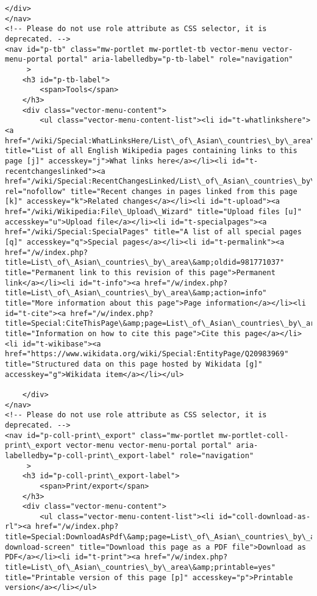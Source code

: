 \documentclass[11pt]{article}
\begin{document}
\begin{Verbatim}[commandchars=\\\{\}]
	</div>
</nav>
<!-- Please do not use role attribute as CSS selector, it is deprecated. -->
<nav id="p-tb" class="mw-portlet mw-portlet-tb vector-menu vector-menu-portal portal" aria-labelledby="p-tb-label" role="navigation" 
	 >
	<h3 id="p-tb-label">
		<span>Tools</span>
	</h3>
	<div class="vector-menu-content">
		<ul class="vector-menu-content-list"><li id="t-whatlinkshere"><a href="/wiki/Special:WhatLinksHere/List\_of\_Asian\_countries\_by\_area" title="List of all English Wikipedia pages containing links to this page [j]" accesskey="j">What links here</a></li><li id="t-recentchangeslinked"><a href="/wiki/Special:RecentChangesLinked/List\_of\_Asian\_countries\_by\_area" rel="nofollow" title="Recent changes in pages linked from this page [k]" accesskey="k">Related changes</a></li><li id="t-upload"><a href="/wiki/Wikipedia:File\_Upload\_Wizard" title="Upload files [u]" accesskey="u">Upload file</a></li><li id="t-specialpages"><a href="/wiki/Special:SpecialPages" title="A list of all special pages [q]" accesskey="q">Special pages</a></li><li id="t-permalink"><a href="/w/index.php?title=List\_of\_Asian\_countries\_by\_area\&amp;oldid=981771037" title="Permanent link to this revision of this page">Permanent link</a></li><li id="t-info"><a href="/w/index.php?title=List\_of\_Asian\_countries\_by\_area\&amp;action=info" title="More information about this page">Page information</a></li><li id="t-cite"><a href="/w/index.php?title=Special:CiteThisPage\&amp;page=List\_of\_Asian\_countries\_by\_area\&amp;id=981771037\&amp;wpFormIdentifier=titleform" title="Information on how to cite this page">Cite this page</a></li><li id="t-wikibase"><a href="https://www.wikidata.org/wiki/Special:EntityPage/Q20983969" title="Structured data on this page hosted by Wikidata [g]" accesskey="g">Wikidata item</a></li></ul>
		
	</div>
</nav>
<!-- Please do not use role attribute as CSS selector, it is deprecated. -->
<nav id="p-coll-print\_export" class="mw-portlet mw-portlet-coll-print\_export vector-menu vector-menu-portal portal" aria-labelledby="p-coll-print\_export-label" role="navigation" 
	 >
	<h3 id="p-coll-print\_export-label">
		<span>Print/export</span>
	</h3>
	<div class="vector-menu-content">
		<ul class="vector-menu-content-list"><li id="coll-download-as-rl"><a href="/w/index.php?title=Special:DownloadAsPdf\&amp;page=List\_of\_Asian\_countries\_by\_area\&amp;action=show-download-screen" title="Download this page as a PDF file">Download as PDF</a></li><li id="t-print"><a href="/w/index.php?title=List\_of\_Asian\_countries\_by\_area\&amp;printable=yes" title="Printable version of this page [p]" accesskey="p">Printable version</a></li></ul>
		

\end{Verbatim}
\end{document}

